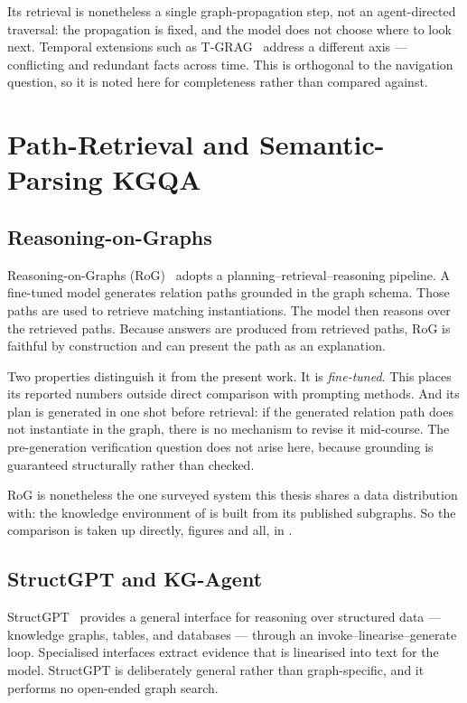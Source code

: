 Its retrieval is nonetheless a single graph-propagation step, not an
agent-directed traversal: the propagation is fixed, and the model does not
choose where to look next. Temporal extensions such as T-GRAG~\cite{li2025tgrag}
address a different axis --- conflicting and redundant facts across time. This
is orthogonal to the navigation question, so it is noted here for completeness
rather than compared against.

\section{Path-Retrieval and Semantic-Parsing KGQA}\label{sec:path-kgqa}

\subsection{Reasoning-on-Graphs}

Reasoning-on-Graphs (RoG)~\cite{luo2024reasoning} adopts a
planning--retrieval--reasoning pipeline. A fine-tuned model generates relation
paths grounded in the graph schema. Those paths are used to retrieve matching
instantiations. The model then reasons over the retrieved paths. Because
answers are produced from retrieved paths, RoG is faithful by construction and
can present the path as an explanation.

Two properties distinguish it from the present work. It is \emph{fine-tuned}.
This places its reported numbers outside direct comparison with prompting
methods. And its plan is generated in one shot before retrieval: if the
generated relation path does not instantiate in the graph, there is no mechanism
to revise it mid-course. The pre-generation verification question does not
arise here, because grounding is guaranteed structurally rather than checked.

RoG is nonetheless the one surveyed system this thesis shares a data
distribution with: the knowledge environment of  is built
from its published subgraphs. So the comparison is taken up directly, figures
and all, in .

\subsection{StructGPT and KG-Agent}

StructGPT~\cite{jiang2023structgpt} provides a general interface for reasoning
over structured data --- knowledge graphs, tables, and databases --- through an
invoke--linearise--generate loop. Specialised interfaces extract evidence that
is linearised into text for the model. StructGPT is deliberately general rather
than graph-specific, and it performs no open-ended graph search.

